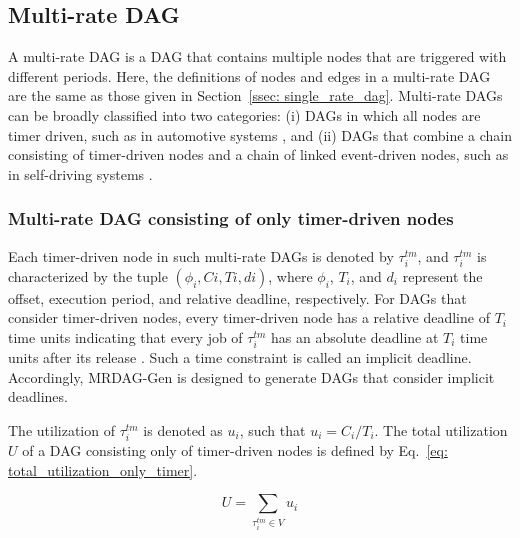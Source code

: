 \subsection{Multi-rate DAG}
\label{ssec: multi_rate_dag}

A multi-rate DAG is a DAG that contains multiple nodes that are triggered with different periods.
Here, the definitions of nodes and edges in a multi-rate DAG are the same as those given in Section~\ref{ssec: single_rate_dag}.
Multi-rate DAGs can be broadly classified into two categories: (i) DAGs in which all nodes are timer driven, such as in automotive systems \cite{kordon2020evaluation, verucchi2020latency}, and (ii) DAGs that combine a chain consisting of timer-driven nodes and a chain of linked event-driven nodes, such as in self-driving systems \cite{choi2021picas, tang2020response}.


\subsubsection{Multi-rate DAG consisting of only timer-driven nodes}
\label{sssec: dag_only_timer}

Each timer-driven node in such multi-rate DAGs is denoted by $\tau^{tm}_i$, and $\tau^{tm}_i$ is characterized by the tuple $(\phi_i, Ci, Ti, di)$, where $\phi_i$, $T_i$, and $d_i$ represent the offset, execution period, and relative deadline, respectively.
For DAGs that consider timer-driven nodes, every timer-driven node has a relative deadline of $T_i$ time units indicating that every job of $\tau^{tm}_i$ has an absolute deadline at $T_i$ time units after its release \cite{yang2020mixed, cho2021conditionally}.
Such a time constraint is called an implicit deadline.
Accordingly, MRDAG-Gen is designed to generate DAGs that consider implicit deadlines.

The utilization of $\tau^{tm}_i$ is denoted as $u_i$, such that $u_i = C_i / T_i$.
The total utilization $U$ of a DAG consisting only of timer-driven nodes is defined by Eq.~\ref{eq: total_utilization_only_timer}.

\begin{equation}
    \label{eq: total_utilization_only_timer}
    U = \sum_{\tau^{tm}_i \in V}u_i
\end{equation}


